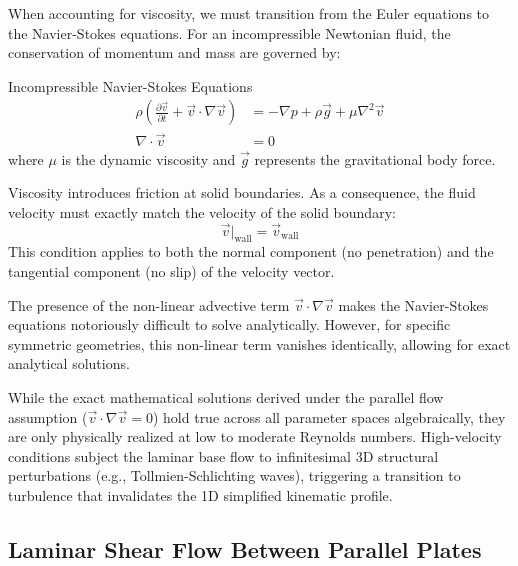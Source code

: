 When accounting for viscosity, we must transition from the Euler equations to the Navier-Stokes equations. For an incompressible Newtonian fluid, the conservation of momentum and mass are governed by:

\begin{eqbox}{Incompressible Navier-Stokes Equations}
\label{eq:navier_stokes}
\begin{align}
\rho \left( \frac{\partial \vec{v}}{\partial t} + \vec{v} \cdot \nabla \vec{v} \right) &= -\nabla p + \rho \vec{g} + \mu \nabla^2 \vec{v} \\[0.5em]
\nabla \cdot \vec{v} &= 0
\end{align}
where $\mu$ is the dynamic viscosity and $\vec{g}$ represents the gravitational body force.
\end{eqbox}

\begin{conceptbox}
Viscosity introduces friction at solid boundaries. As a consequence, the fluid velocity must exactly match the velocity of the solid boundary:
\begin{equation}
\vec{v}\big|_{\text{wall}} = \vec{v}_{\text{wall}}
\end{equation}
This condition applies to both the normal component (no penetration) and the tangential component (no slip) of the velocity vector.
\end{conceptbox}

The presence of the non-linear advective term $\vec{v} \cdot \nabla \vec{v}$ makes the Navier-Stokes equations notoriously difficult to solve analytically. However, for specific symmetric geometries, this non-linear term vanishes identically, allowing for exact analytical solutions. 

\begin{notebox}
While the exact mathematical solutions derived under the parallel flow assumption ($\vec{v} \cdot \nabla \vec{v} = 0$) hold true across all parameter spaces algebraically, they are only physically realized at low to moderate Reynolds numbers. High-velocity conditions subject the laminar base flow to infinitesimal 3D structural perturbations (e.g., Tollmien-Schlichting waves), triggering a transition to turbulence that invalidates the 1D simplified kinematic profile.
\end{notebox}

\subsection{Laminar Shear Flow Between Parallel Plates}

